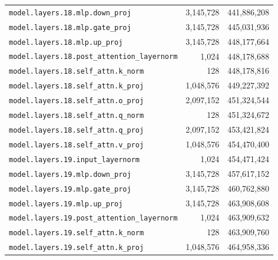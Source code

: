\documentclass[10pt,a4paper]{article}
\theoremstyle{definition}
\begin{document}
\begin{appendices}
\begin{longtable}{p{9.5cm}rr}
\texttt{model.\allowbreak{}layers.\allowbreak{}18.\allowbreak{}mlp.\allowbreak{}down\_proj} & 3,145,728 & 441,886,208 \\
\texttt{model.\allowbreak{}layers.\allowbreak{}18.\allowbreak{}mlp.\allowbreak{}gate\_proj} & 3,145,728 & 445,031,936 \\
\texttt{model.\allowbreak{}layers.\allowbreak{}18.\allowbreak{}mlp.\allowbreak{}up\_proj} & 3,145,728 & 448,177,664 \\
\texttt{model.\allowbreak{}layers.\allowbreak{}18.\allowbreak{}post\_attention\_layernorm} & 1,024 & 448,178,688 \\
\texttt{model.\allowbreak{}layers.\allowbreak{}18.\allowbreak{}self\_attn.\allowbreak{}k\_norm} & 128 & 448,178,816 \\
\texttt{model.\allowbreak{}layers.\allowbreak{}18.\allowbreak{}self\_attn.\allowbreak{}k\_proj} & 1,048,576 & 449,227,392 \\
\texttt{model.\allowbreak{}layers.\allowbreak{}18.\allowbreak{}self\_attn.\allowbreak{}o\_proj} & 2,097,152 & 451,324,544 \\
\texttt{model.\allowbreak{}layers.\allowbreak{}18.\allowbreak{}self\_attn.\allowbreak{}q\_norm} & 128 & 451,324,672 \\
\texttt{model.\allowbreak{}layers.\allowbreak{}18.\allowbreak{}self\_attn.\allowbreak{}q\_proj} & 2,097,152 & 453,421,824 \\
\texttt{model.\allowbreak{}layers.\allowbreak{}18.\allowbreak{}self\_attn.\allowbreak{}v\_proj} & 1,048,576 & 454,470,400 \\
\texttt{model.\allowbreak{}layers.\allowbreak{}19.\allowbreak{}input\_layernorm} & 1,024 & 454,471,424 \\
\texttt{model.\allowbreak{}layers.\allowbreak{}19.\allowbreak{}mlp.\allowbreak{}down\_proj} & 3,145,728 & 457,617,152 \\
\texttt{model.\allowbreak{}layers.\allowbreak{}19.\allowbreak{}mlp.\allowbreak{}gate\_proj} & 3,145,728 & 460,762,880 \\
\texttt{model.\allowbreak{}layers.\allowbreak{}19.\allowbreak{}mlp.\allowbreak{}up\_proj} & 3,145,728 & 463,908,608 \\
\texttt{model.\allowbreak{}layers.\allowbreak{}19.\allowbreak{}post\_attention\_layernorm} & 1,024 & 463,909,632 \\
\texttt{model.\allowbreak{}layers.\allowbreak{}19.\allowbreak{}self\_attn.\allowbreak{}k\_norm} & 128 & 463,909,760 \\
\texttt{model.\allowbreak{}layers.\allowbreak{}19.\allowbreak{}self\_attn.\allowbreak{}k\_proj} & 1,048,576 & 464,958,336 \\

\end{longtable}
\end{appendices}
\end{document}
